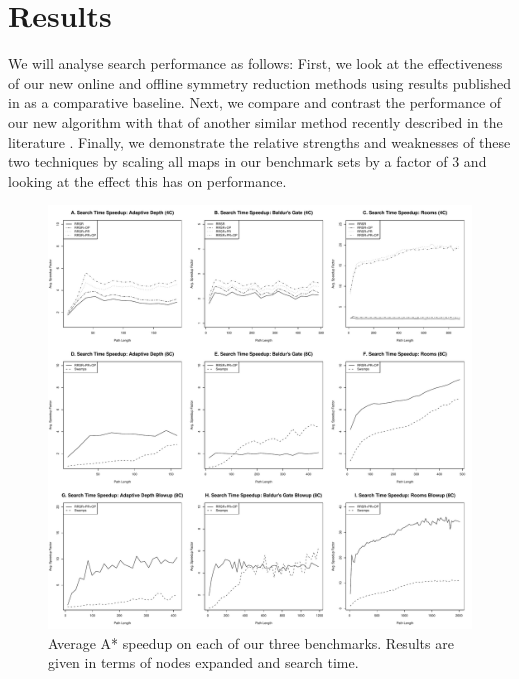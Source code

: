 \section{Results}
\label{sec-results}
%

We will analyse search performance as follows: 
First, we look at the effectiveness of our new online and offline symmetry
reduction methods using results published in \cite{harabor10} as a 
comparative baseline.
Next, we compare and contrast the performance of our new algorithm with that
of another similar method recently described in the literature \cite{pochter10}.
Finally, we demonstrate the relative strengths and weaknesses of these two
techniques by scaling all maps in our benchmark sets by a factor of 3 and looking
at the effect this has on performance.


\begin{figure}[t]
       \begin{center}
                       \includegraphics[width=1.95\columnwidth, trim = 10mm 10mm 10mm 0mm]{diagrams/speedup.pdf}
       \end{center}
       \caption{Average A* speedup on each of our three benchmarks. 
		Results are given in terms of nodes expanded and search time.}
\label{fig-speedup}
\end{figure}

